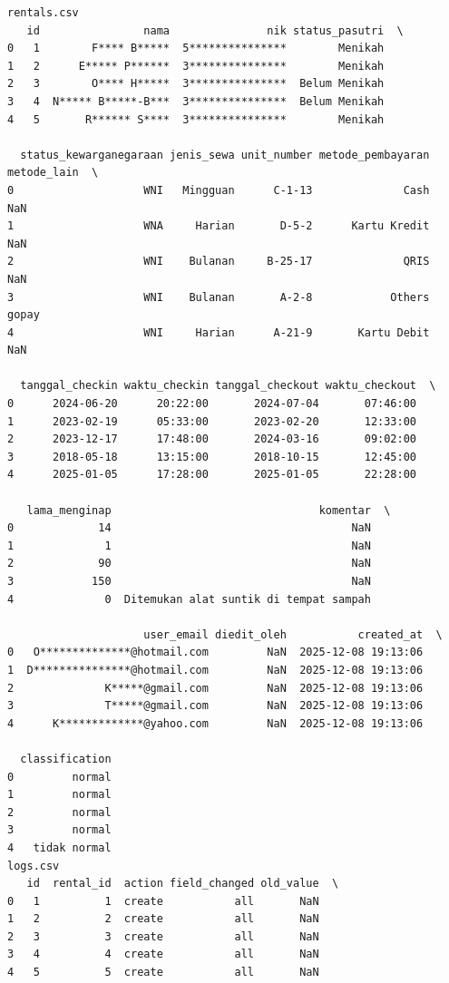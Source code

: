 \begin{lstlisting}[caption={Output 10}]
rentals.csv
   id                nama               nik status_pasutri  \
0   1        F**** B*****  5***************        Menikah   
1   2      E***** P******  3***************        Menikah   
2   3        O**** H*****  3***************  Belum Menikah   
3   4  N***** B*****-B***  3***************  Belum Menikah   
4   5       R****** S****  3***************        Menikah   

  status_kewarganegaraan jenis_sewa unit_number metode_pembayaran metode_lain  \
0                    WNI   Mingguan      C-1-13              Cash         NaN   
1                    WNA     Harian       D-5-2      Kartu Kredit         NaN   
2                    WNI    Bulanan     B-25-17              QRIS         NaN   
3                    WNI    Bulanan       A-2-8            Others       gopay   
4                    WNI     Harian      A-21-9       Kartu Debit         NaN   

  tanggal_checkin waktu_checkin tanggal_checkout waktu_checkout  \
0      2024-06-20      20:22:00       2024-07-04       07:46:00   
1      2023-02-19      05:33:00       2023-02-20       12:33:00   
2      2023-12-17      17:48:00       2024-03-16       09:02:00   
3      2018-05-18      13:15:00       2018-10-15       12:45:00   
4      2025-01-05      17:28:00       2025-01-05       22:28:00   

   lama_menginap                                komentar  \
0             14                                     NaN   
1              1                                     NaN   
2             90                                     NaN   
3            150                                     NaN   
4              0  Ditemukan alat suntik di tempat sampah   

                     user_email diedit_oleh           created_at  \
0   O**************@hotmail.com         NaN  2025-12-08 19:13:06   
1  D***************@hotmail.com         NaN  2025-12-08 19:13:06   
2              K*****@gmail.com         NaN  2025-12-08 19:13:06   
3              T*****@gmail.com         NaN  2025-12-08 19:13:06   
4      K*************@yahoo.com         NaN  2025-12-08 19:13:06   

  classification  
0         normal  
1         normal  
2         normal  
3         normal  
4   tidak normal  
logs.csv
   id  rental_id  action field_changed old_value  \
0   1          1  create           all       NaN   
1   2          2  create           all       NaN   
2   3          3  create           all       NaN   
3   4          4  create           all       NaN   
4   5          5  create           all       NaN   


\end{lstlisting}
